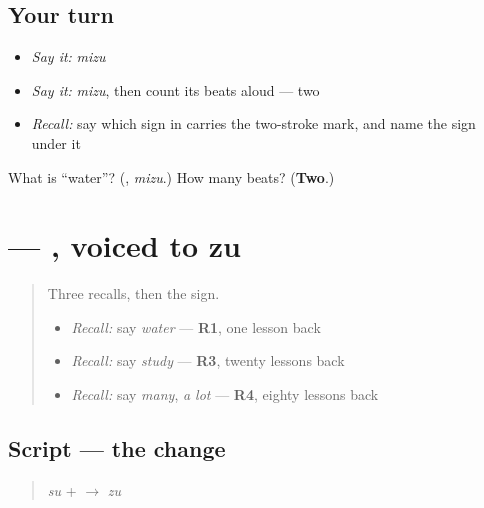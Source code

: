 \subsection*{Your turn}
\begin{itemize}
\raggedright
  \item \emph{Say it:} \emph{mizu}
  \item \emph{Say it:} \emph{mizu}, then count its beats aloud — two
  \item \emph{Recall:} say which sign in \textbf{} carries the two-stroke mark, and name the sign under it
\end{itemize}

\begin{tcolorbox}[breakable,colback=teal!4,colframe=teal!35!black,title={Before you move on}]
What is \textquotedblleft{}water\textquotedblright{}? (\textbf{}, \emph{mizu}.) How many beats? (\textbf{Two}.)
\end{tcolorbox}
\section[\texorpdfstring{\ja{ず} (zu)}{ず (zu)}]{ — , voiced to zu}

\label{lesson:JA-W136-zu}



\begin{quote}
Three recalls, then the sign.

\begin{itemize}
\raggedright
  \item \emph{Recall:} say \emph{water} — \textbf{R1}, one lesson back
  \item \emph{Recall:} say \emph{study} — \textbf{R3}, twenty lessons back
  \item \emph{Recall:} say \emph{many}, \emph{a lot} — \textbf{R4}, eighty lessons back
\end{itemize}
\end{quote}

\subsection*{Script — the change}

\begin{quote}
\textbf{} \emph{su} + \textbf{} $\to$ \textbf{} \emph{zu}
\end{quote}

